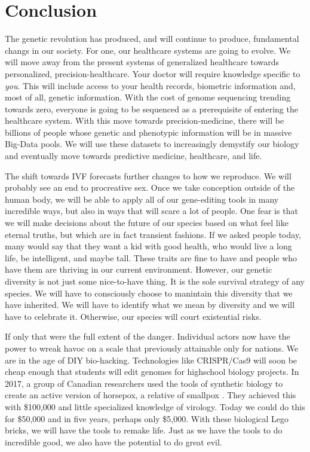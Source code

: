 \section{Conclusion}
\label{sec:conclusion}

The genetic revolution has produced, and will continue to produce, fundamental changs in our society.
For one, our healthcare systems are going to evolve.
We will move away from the present systems of generalized healthcare towards personalized, precision-healthcare.
Your doctor will require knowledge specific to \textit{you}.
This will include access to your health records, biometric information and, most of all, genetic information.
With the cost of genome sequencing trending towards zero, everyone is going to be sequenced as a prerequisite of entering the healthcare system.
With this move towards precision-medicine, there will be billions of people whose genetic and phenotypic information will be in massive Big-Data pools.
We will use these datasets to increasingly demystify our biology and eventually move towards predictive medicine, healthcare, and life.

The shift towards IVF forecasts further changes to how we reproduce.
We will probably see an end to procreative sex.
Once we take conception outside of the human body, we will be able to apply all of our gene-editing tools in many incredible ways, but also in ways that will scare a lot of people.
One fear is that we will make decisions about the future of our species based on what feel like eternal truths, but which are in fact transient fashions.
If we asked people today, many would say that they want a kid with good health, who would live a long life, be intelligent, and maybe tall.
These traits are fine to have and people who have them are thriving in our current environment.
However, our genetic diversity is not just some nice-to-have thing.
It is the sole survival strategy of any species.
We will have to consciously choose to manintain this diversity that we have inherited.
We will have to identify what we mean by diversity and we will have to celebrate it.
Otherwise, our species will court existential risks.

If only that were the full extent of the danger.
Individual actors now have the power to wreak havoc on a scale that previously attainable only for nations.
We are in the age of DIY bio-hacking.
Technologies like CRISPR/Cas9 will soon be cheap enough that students will edit genomes for highschool biology projects.
In 2017, a group of Canadian researchers used the tools of synthetic biology to create an active version of horsepox, a relative of smallpox \cite{Kupferschmidt2017}.
They achieved this with \$100,000 and little specialized knowledge of virology.
Today we could do this for \$50,000 and in five years, perhaps only \$5,000.
With these biological Lego bricks, we will have the tools to remake life.
Just as we have the tools to do incredible good, we also have the potential to do great evil.

